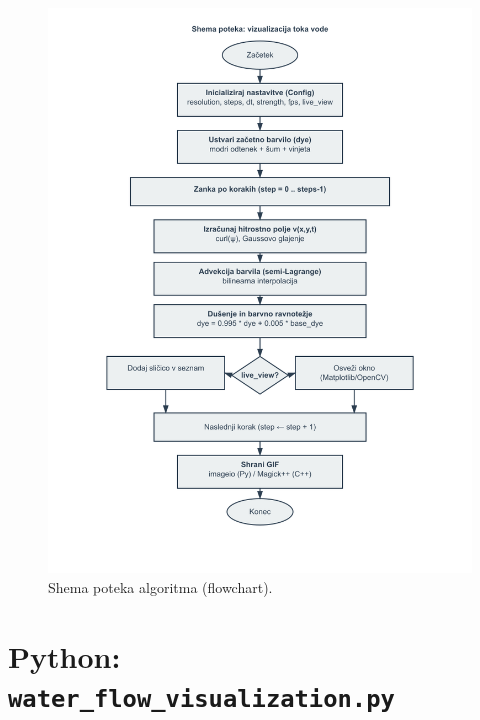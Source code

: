 \documentclass[11pt,a4paper]{article}
\begin{document}
\begin{figure}[H]
  \centering
  \includegraphics[width=0.95\linewidth]{flowchart.png}
  \caption{Shema poteka algoritma (flowchart).}
\end{figure}

\section{Python: \texttt{water\_flow\_visualization.py}}
\end{document}
